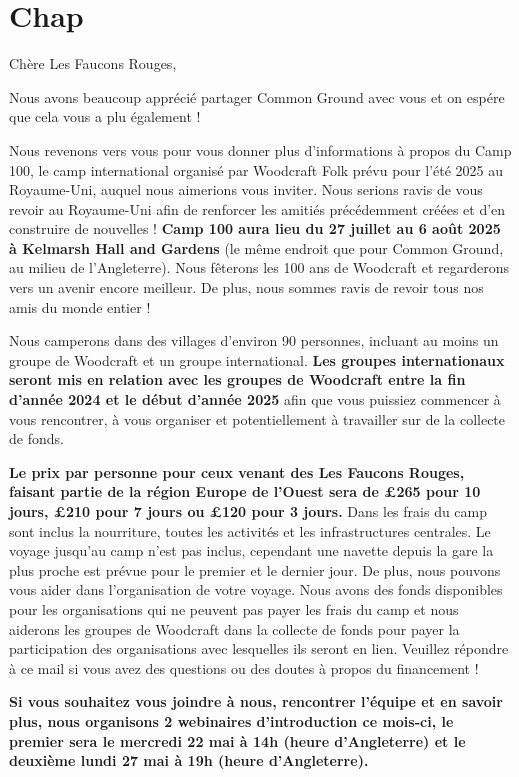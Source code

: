 \documentclass[a4paper, 11pt]{report}
\begin{document}
\makedocumenttitlepage
\tableofcontents


\chapter{Chap}
Ch\`ere Les Faucons Rouges,

Nous avons beaucoup appr\'eci\'e partager Common Ground avec vous et on esp\'ere que cela vous a plu \'egalement ! 

Nous revenons vers vous pour vous donner plus d'informations \`a propos du Camp 100, le camp international organis\'e par Woodcraft Folk pr\'evu pour l'\'et\'e 2025 au Royaume-Uni, auquel nous aimerions vous inviter. Nous serions ravis de vous revoir au Royaume-Uni afin de renforcer les amiti\'es pr\'ec\'edemment cr\'e\'ees et d'en construire de nouvelles ! \textbf{Camp 100 aura lieu du 27 juillet au 6 ao\^ut 2025 \`a Kelmarsh Hall and Gardens} (le m\^eme endroit que pour Common Ground, au milieu de l'Angleterre). Nous f\^eterons les 100 ans de Woodcraft et regarderons vers un avenir encore meilleur. De plus, nous sommes ravis de revoir tous nos amis du monde entier !

Nous camperons dans des villages d'environ 90 personnes, incluant au moins un groupe de Woodcraft et un groupe international. \textbf{Les groupes internationaux seront mis en relation avec les groupes de Woodcraft entre la fin d'ann\'ee 2024 et le d\'ebut d'ann\'ee 2025} afin que vous puissiez commencer \`a vous rencontrer, \`a vous organiser et potentiellement \`a travailler sur de la collecte de fonds.

\textbf{Le prix par personne pour ceux venant des Les Faucons Rouges, faisant partie de la r\'egion Europe de l'Ouest sera de £265 pour 10 jours, £210 pour 7 jours ou £120 pour 3 jours.} Dans les frais du camp sont inclus la nourriture, toutes les activit\'es et les infrastructures centrales. Le voyage jusqu'au camp n'est pas inclus, cependant une navette depuis la gare la plus proche est pr\'evue pour le premier et le dernier jour. De plus, nous pouvons vous aider dans l'organisation de votre voyage. Nous avons des fonds disponibles pour les organisations qui ne peuvent pas payer les frais du camp et nous aiderons les groupes de Woodcraft dans la collecte de fonds pour payer la participation des organisations avec lesquelles ils seront en lien. Veuillez r\'epondre \`a ce mail si vous avez des questions ou des doutes \`a propos du financement ! 

\textbf{Si vous souhaitez vous joindre \`a nous, rencontrer l'\'equipe et en savoir plus, nous organisons 2 webinaires d'introduction ce mois-ci, le premier sera le mercredi 22 mai \`a 14h (heure d'Angleterre) et le deuxième lundi 27 mai \`a 19h (heure d'Angleterre).}
\end{document}
